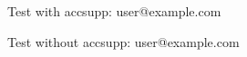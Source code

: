 \documentclass{article}
\begin{document}
Test with accsupp: 
\faEnvelope\EndAccSupp{} user@example.com

Test without accsupp:
\faEnvelope user@example.com
\end{document}
